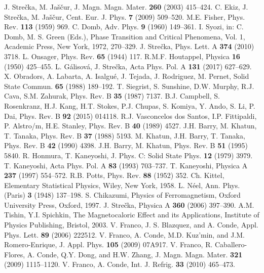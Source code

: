 \documentclass[final,5p,times,sort&compress]{elsarticle}
\begin{document}
\begin{thebibliography}{50}
J. Stre\v{c}ka, M. Ja\v{s}\v{c}ur, J. Magn. Magn. Mater. {\bf 260} (2003) 415--424.
C. Ekiz, J. Stre\v{c}ka, M. Ja\v{s}\v{c}ur, Cent. Eur. J. Phys. {\bf 7} (2009) 509--520.
M.E. Fisher, Phys. Rev. {\bf 113} (1959) 969.
C. Domb, Adv. Phys. {\bf 9} (1960) 149--361.
I. Syozi, in: C. Domb, M. S. Green (Eds.), Phase Transition and Critical Phenomena, Vol. 1, Academic Press, New York, 1972, 270--329.
J. Stre\v{c}ka, Phys. Lett. A {\bf 374} (2010) 3718.
L. Onsager, Phys. Rev. {\bf 65} (1944) 117.
R.M.F. Houtappel, Physica {\bf 16} (1950) 425--455.
L. G\'alisov\'a, J. Stre\v{c}ka, Acta Phys. Pol. A  {\bf 131} (2017) 627--629.
X. Obradors, A. Labarta, A. Isalgu\'e, J. Tejada, J. Rodriguez, M. Pernet, Solid State Commun. {\bf 65} (1988) 189--192.
T. Siegrist, S. Sunshine, D.W. Murphy, R.J. Cava, S.M. Zahurak, Phys. Rev. B {\bf 35} (1987) 7137.
B.J. Campbell, S. Rosenkranz, H.J. Kang, H.T. Stokes, P.J. Chupas, S. Komiya, Y. Ando, S. Li, P. Dai, Phys. Rev. B {\bf 92} (2015) 014118.
R.J. Vasconcelos dos Santos, I.P. Fittipaldi, P. Alstro/m, H.E. Stanley, Phys. Rev. B {\bf 40} (1989) 4527.
J.H. Barry, M. Khatun, T. Tanaka, Phys. Rev. B {\bf 37} (1988) 5193.
M. Khatun, J.H. Barry, T. Tanaka, Phys. Rev. B {\bf 42} (1990) 4398.
J.H. Barry, M. Khatun, Phys. Rev. B {\bf 51} (1995) 5840.
R. Honmura, T. Kaneyoshi, J. Phys. C: Solid State Phys. {\bf 12} (1979) 3979.
T. Kaneyoshi, Acta Phys. Pol. A {\bf 83} (1993) 703--737.
T. Kaneyoshi, Physica A {\bf 237} (1997) 554--572.
R.B. Potts, Phys. Rev. {\bf 88} (1952) 352.
Ch. Kittel, Elementary Statistical Physics, Wiley, New York, 1958.
L. N\'eel,  Ann. Phys. (Paris) {\bf 3} (1948) 137--198.
S. Chikazumi,  Physics of Ferromagnetism, Oxford University Press, Oxford, 1997.
J. Stre\v{c}ka,  Physica A {\bf 360} (2006) 397--390.
A.M. Tishin, Y.I. Spichkin, The Magnetocaloric Effect and its Applications, Institute of Physics Publishing, Bristol, 2003.
V. Franco, J. S. Blazquez, and A. Conde, Appl. Phys. Lett. {\bf 89} (2006) 222512.
V. Franco, A. Conde, M.D. Kuz'min, and J.M. Romero-Enrique, J. Appl. Phys. {\bf 105} (2009) 07A917.
V. Franco, R. Caballero-Flores, A. Conde, Q.Y. Dong, and H.W. Zhang, J. Magn. Magn. Mater. {\bf 321} (2009) 1115--1120.
V. Franco, A. Conde, Int. J. Refrig. {\bf 33} (2010) 465--473.
\end{thebibliography}
\end{document}
